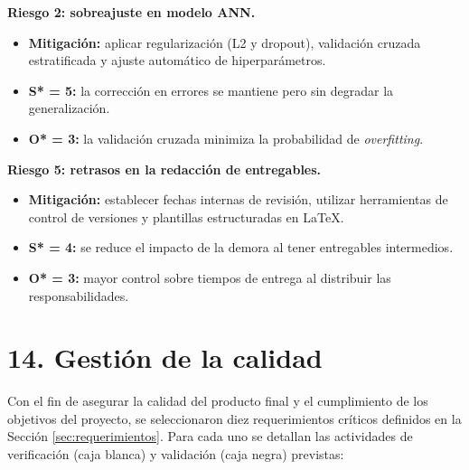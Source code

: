 \documentclass[
11pt, %
]{charter}
\begin{document}
\textbf{Riesgo 2: sobreajuste en modelo ANN.}
\begin{itemize}
    \item \textbf{Mitigación:} aplicar regularización (L2 y dropout), validación cruzada estratificada y ajuste automático de hiperparámetros.
    \item \textbf{S* = 5:} la corrección en errores se mantiene pero sin degradar la generalización.
    \item \textbf{O* = 3:} la validación cruzada minimiza la probabilidad de \textit{overfitting}.
\end{itemize}

\textbf{Riesgo 5: retrasos en la redacción de entregables.}
\begin{itemize}
    \item \textbf{Mitigación:} establecer fechas internas de revisión, utilizar herramientas de control de versiones y plantillas estructuradas en \LaTeX.
    \item \textbf{S* = 4:} se reduce el impacto de la demora al tener entregables intermedios.
    \item \textbf{O* = 3:} mayor control sobre tiempos de entrega al distribuir las responsabilidades.
\end{itemize}


\section{14. Gestión de la calidad}
\label{sec:calidad}

Con el fin de asegurar la calidad del producto final y el cumplimiento de los objetivos del proyecto, se seleccionaron diez requerimientos críticos definidos en la Sección \ref{sec:requerimientos}. Para cada uno se detallan las actividades de verificación (caja blanca) y validación (caja negra) previstas:
\end{document}
